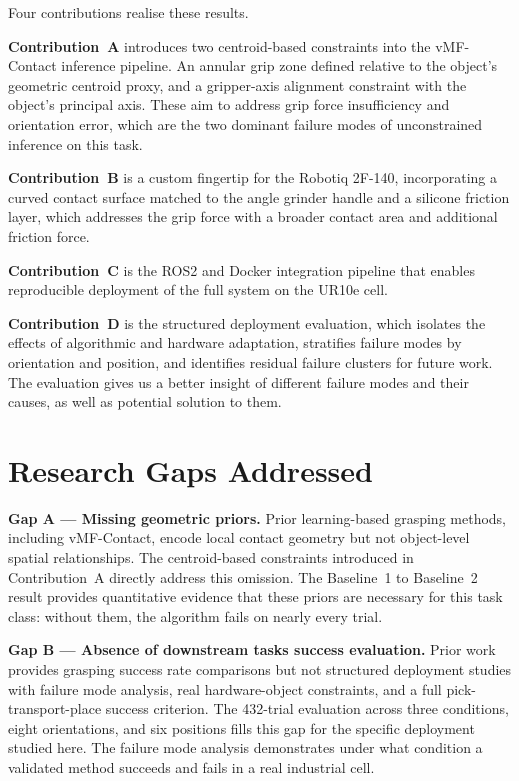 \documentclass[oneside,studentpaper]{wbk}
\begin{document}
Four contributions realise these results.

\textbf{Contribution~A} introduces two centroid-based constraints into the vMF-Contact inference pipeline. An annular grip zone defined relative to the object's geometric centroid proxy, and a gripper-axis alignment constraint with the object's principal axis. These aim to address grip force insufficiency and orientation error, which are the two dominant failure modes of unconstrained inference on this task. 

\textbf{Contribution~B} is a custom fingertip for the Robotiq 2F-140, incorporating a curved contact surface matched to the angle grinder handle and a silicone friction layer, which addresses the grip force with a broader contact area and additional friction force.

\textbf{Contribution~C} is the ROS2 and Docker integration pipeline that enables reproducible deployment of the full system on the UR10e cell.

\textbf{Contribution~D} is the structured deployment evaluation, which isolates the effects of algorithmic and hardware adaptation, stratifies failure modes by orientation and position, and identifies residual failure clusters for future work. The evaluation gives us a better insight of different failure modes and their causes, as well as potential solution to them.

\section{Research Gaps Addressed}
\label{sec:research-gaps-addressed}

\textbf{Gap A --- Missing geometric priors.} Prior learning-based grasping methods, including vMF-Contact, encode local contact geometry but not object-level spatial relationships. The centroid-based constraints introduced in Contribution~A directly address this omission. The Baseline~1 to Baseline~2 result provides quantitative evidence that these priors are necessary for this task class: without them, the algorithm fails on nearly every trial.

\textbf{Gap B --- Absence of downstream tasks success evaluation.} Prior work provides grasping success rate comparisons but not structured deployment studies with failure mode analysis, real hardware-object constraints, and a full pick-transport-place success criterion. The 432-trial evaluation across three conditions, eight orientations, and six positions fills this gap for the specific deployment studied here. The failure mode analysis demonstrates under what condition a validated method succeeds and fails in a real industrial cell.
\end{document}
